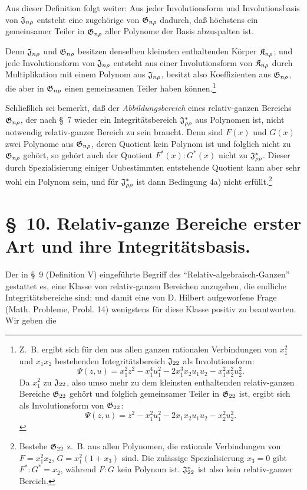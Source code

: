Aus dieser Definition folgt weiter: Aus jeder Involutionsform und Involutionsbasis von $\mathfrak{J}_{n\rho}$ entsteht eine zugehörige von $\mathfrak{G}_{n\rho}$ dadurch, daß höchstens ein gemeinsamer Teiler in $\mathfrak{G}_{n\rho}$ aller Polynome der Basis abzuspalten ist.

Denn $\mathfrak{J}_{n\rho}$ und $\mathfrak{G}_{n\rho}$ besitzen denselben kleinsten enthaltenden Körper $\mathfrak{K}_{n\rho}$; und jede Involutionsform von $\mathfrak{J}_{n\rho}$ entsteht aus einer Involutionsform von $\mathfrak{K}_{n\rho}$ durch Multiplikation mit einem Polynom aus $\mathfrak{J}_{n\rho}$, besitzt also Koeffizienten aus $\mathfrak{G}_{n\rho}$, die aber in $\mathfrak{G}_{n\rho}$ einen gemeinsamen Teiler haben können.\footnote{Z.~B. ergibt sich für den aus allen ganzen rationalen Verbindungen von $x_1^2$ und $x_1x_2$ bestehenden Integritätsbereich $\mathfrak{J}_{22}$ als Involutionsform:
\[
\Psi(z,u)=x_1^2z^2-x_1^4u_1^2-2x_1^3x_2u_1u_2-x_1^2x_2^2u_2^2.
\]
Da $x_1^2$ zu $\mathfrak{J}_{22}$, also umso mehr zu dem kleinsten enthaltenden relativ-ganzen Bereiche $\mathfrak{G}_{22}$ gehört und folglich gemeinsamer Teiler in $\mathfrak{G}_{22}$ ist, ergibt sich als Involutionsform von $\mathfrak{G}_{22}$:
\[
\Psi(z,u)=z^2-x_1^2u_1^2-2x_1x_2u_1u_2-x_2^2u_2^2.
\]}

Schließlich sei bemerkt, daß der \emph{Abbildungsbereich} eines relativ-ganzen Bereichs $\mathfrak{G}_{n\rho}$, der nach \S\ 7 wieder ein Integritätsbereich $\mathfrak{J}^*_{\rho\rho}$ aus Polynomen ist, nicht notwendig relativ-ganzer Bereich zu sein braucht. Denn sind $F(x)$ und $G(x)$ zwei Polynome aus $\mathfrak{G}_{n\rho}$, deren Quotient kein Polynom ist und folglich nicht zu $\mathfrak{G}_{n\rho}$ gehört, so gehört auch der Quotient $F^*(x):G^*(x)$ nicht zu $\mathfrak{J}^*_{\rho\rho}$. Dieser durch Spezialisierung einiger Unbestimmten entstehende Quotient kann aber sehr wohl ein Polynom sein, und für $\mathfrak{J}^*_{\rho\rho}$ ist dann Bedingung 4a) nicht erfüllt.\footnote{Bestehe $\mathfrak{G}_{22}$ z.~B. aus allen Polynomen, die rationale Verbindungen von $F=x_1^2x_2$, $G=x_1^2(1+x_3)$ sind. Die zulässige Spezialisierung $x_3=0$ gibt $F^*:G^*=x_2$, während $F:G$ kein Polynom ist. $\mathfrak{J}^*_{22}$ ist also kein relativ-ganzer Bereich.}

\section*{\S\ 10. Relativ-ganze Bereiche erster Art und ihre Integritätsbasis.}

Der in \S\ 9 (Definition V) eingeführte Begriff des ``Relativ-algebraisch-Ganzen'' gestattet es, eine Klasse von relativ-ganzen Bereichen anzugeben, die endliche Integritätsbereiche sind; und damit eine von D. Hilbert aufgeworfene Frage (Math. Probleme, Probl. 14) wenigstens für diese Klasse positiv zu beantworten. Wir geben die

